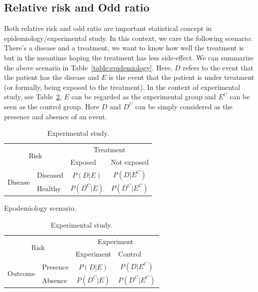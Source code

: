 \documentclass[11pt]{report}
\begin{document}
\subsection{Relative risk and Odd ratio}
Both relative risk and odd ratio are important statistical concept in epidemiology/experimental study. In this context, we care the following scenario: There's a disease and a treatment, we want to know how well the treatment is but in the meantime hoping the treatment has less side-effect. We can summarize the above scenario in Table~\ref{table:epidemiology}. Here, $D$ refers to the event that the patient has the disease and $E$ is the event that the patient is under treatment (or formally, being exposed to the treatment). In the context of experimental study, see Table~\ref{table:experimentalstudy}, $E$ can be regarded as the experimental group and $E^C$ can be seen as the control group. Here $D$ and $D^C$ can be simply considered as the presence and absence of an event.

\begin{table}[h]	
	
	\begin{minipage}{.5\textwidth}
		\centering
		\begin{tabular}{|l|l|c|c|}
			\hline
			\multicolumn{2}{|c|}{\multirow{2}{*}{Risk}} & \multicolumn{2}{c|}{Treatment}                                    \\ \cline{3-4} 
			\multicolumn{2}{|c|}{}                      & \multicolumn{1}{l|}{Exposed} & \multicolumn{1}{l|}{Not exposed} \\ \hline
			\multirow{2}{*}{Disease}      & Diseased     & $P(D|E)$                      & $P(D|E^C)$                        \\ \cline{2-4} 
			& Healthy      & $P(D^C|E)$                    & $P(D^C|E^C)$                      \\ \hline
		\end{tabular}
		\caption{Epodemiology scenario.}
		\label{table:epidemiology}
	\end{minipage}
	\begin{minipage}{.5\textwidth}
		\centering
		\begin{tabular}{|l|l|c|c|}
			\hline
			\multicolumn{2}{|c|}{\multirow{2}{*}{Risk}} & \multicolumn{2}{c|}{Experiment}                                    \\ \cline{3-4} 
			\multicolumn{2}{|c|}{}                      & \multicolumn{1}{l|}{Experiment} & \multicolumn{1}{l|}{Control} \\ \hline
			\multirow{2}{*}{Outcome}      & Presence     & $P(D|E)$                      & $P(D|E^C)$                        \\ \cline{2-4} 
			& Absence      & $P(D^C|E)$                    & $P(D^C|E^C)$                      \\ \hline
		\end{tabular}
		\caption{Experimental study.}
		\label{table:experimentalstudy}
	\end{minipage}
\end{table}
\end{document}
